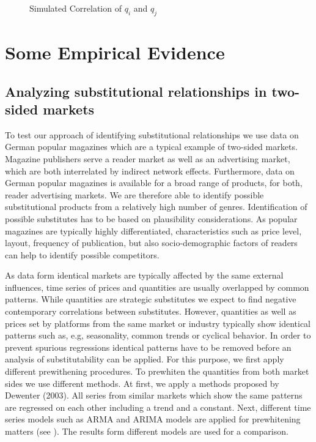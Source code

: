 \documentclass[12pt,a4paper]{scrreprt}
\begin{document}

\begin{figure}[H]
	\centering
	\caption{Simulated Correlation of $q_i$ and $q_j$}
	\begin{adjustbox}{width=\textwidth}	
	
	\label{fig_QQ}
\end{adjustbox}
\end{figure}

\chapter{Some Empirical Evidence}\label{empirical}
\section{Analyzing substitutional relationships in two-sided markets}

To test our approach of identifying substitutional relationships we use data on German popular magazines which are a typical example of two-sided markets. Magazine publishers serve a reader market as well as an advertising market, which are both interrelated by indirect network effects. Furthermore, data on German popular magazines is available for a broad range of products, for both, reader advertising markets. We are therefore able to identify possible substitutional products from a relatively high number of genres. Identification of possible substitutes has to be based on plausibility considerations. As popular magazines are typically highly differentiated, characteristics such as price level, layout, frequency of publication, but also socio-demographic factors of readers can help to identify possible competitors.  

As data form identical markets are typically affected by the same external influences, time series of prices and quantities are usually overlapped by common patterns. While quantities are strategic substitutes we expect to find negative contemporary correlations between substitutes. However, quantities as well as prices set by platforms from the same market or industry typically show identical patterns such as, e.g, seasonality, common trends or cyclical behavior. In order to prevent spurious regressions identical patterns have to be removed before an analysis of substitutability can be applied. For this purpose, we first apply different prewithening procedures. To prewhiten the quantities from both market sides we use different methods. At first, we apply a methods proposed by Dewenter (2003). All series from similar markets which show the same patterns are regressed on each other including a trend and a constant. Next, different time series models such as ARMA and ARIMA models are applied for prewhitening matters (see \cite{box_time_2008}). The results form different models are used for a comparison.
\end{document}
